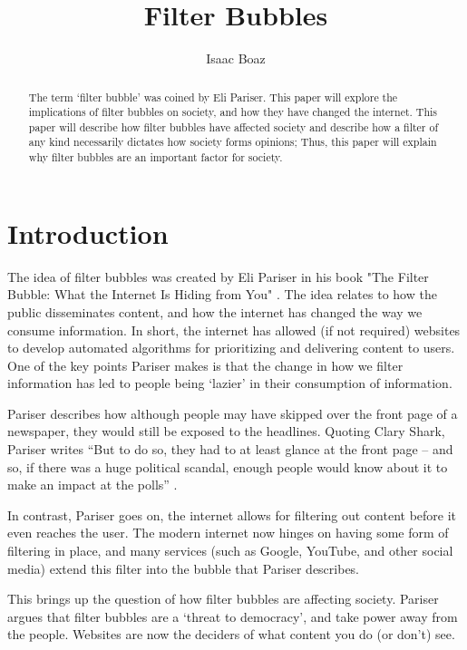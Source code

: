 \documentclass[12pt]{article}
\begin{document}
\title{Filter Bubbles}
\author{Isaac Boaz}
\maketitle

\begin{abstract}
    The term `filter bubble' was coined by Eli Pariser. This paper will explore
    the implications of filter bubbles on society, and how they have changed the
    internet. This paper will describe how filter bubbles have affected society
    and describe how a filter of any kind necessarily dictates how society forms
    opinions; Thus, this paper will explain why filter bubbles are an important
    factor for society.
\end{abstract}


\section{Introduction}
The idea of filter bubbles was created by Eli Pariser in his book "The Filter
Bubble: What the Internet Is Hiding from You" \cite{elifilter}. The idea relates
to how the public disseminates content, and how the internet has changed the way
we consume information. In short, the internet has allowed (if not required)
websites to develop automated algorithms for prioritizing and delivering content
to users. One of the key points Pariser makes is that the change in how we
filter information has led to people being `lazier' in their consumption of
information.

Pariser describes how although people may have skipped over the front page of a
newspaper, they would still be exposed to the headlines. Quoting Clary Shark,
Pariser writes ``But to do so, they had to at least glance at the front page --
and so, if there was a huge political scandal, enough people would know about it
to make an impact at the polls'' \cite{elifilter}.

In contrast, Pariser goes on, the internet allows for filtering out content
before it even reaches the user. The modern internet now hinges on having some
form of filtering in place, and many services (such as Google, YouTube, and
other social media) extend this filter into the bubble that Pariser describes.

This brings up the question of how filter bubbles are affecting society. Pariser
argues that filter bubbles are a `threat to democracy', and take power away from
the people. Websites are now the deciders of what content you do (or don't) see.
\end{document}
